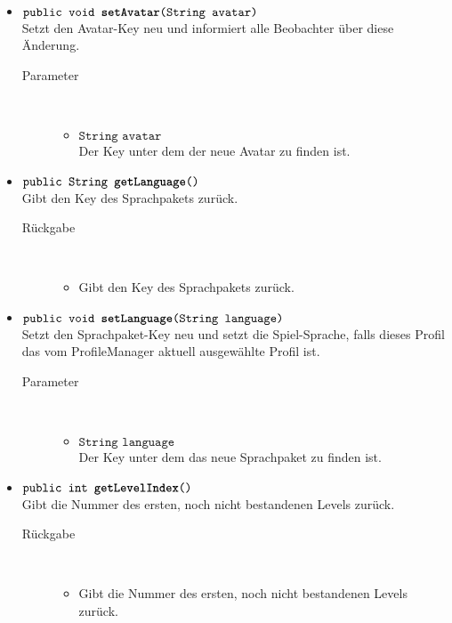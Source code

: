 \begin{description}
\begin{itemize}
		\item $\texttt{public void \textbf{setAvatar}(String avatar)}$ \\ Setzt den Avatar-Key neu und informiert alle Beobachter über diese Änderung.
		\begin{description}
			\item[Parameter] \hfill \\
			\vspace{-.8cm}
			\begin{itemize}
				\item $\texttt{String avatar}$ \\ Der Key unter dem der neue Avatar zu finden ist.
			\end{itemize}
		\end{description}
		
		\item $\texttt{public String \textbf{getLanguage}()}$ \\ Gibt den Key des Sprachpakets zurück.
		\begin{description}
			\item[Rückgabe] \hfill \\
			\vspace{-.8cm}
			\begin{itemize}
				\item Gibt den Key des Sprachpakets zurück.
			\end{itemize}
		\end{description}
		
		\item $\texttt{public void \textbf{setLanguage}(String language)}$ \\ Setzt den Sprachpaket-Key neu und setzt die Spiel-Sprache, falls dieses Profil das vom ProfileManager aktuell ausgewählte Profil ist.
		\begin{description}
			\item[Parameter] \hfill \\
			\vspace{-.8cm}
			\begin{itemize}
				\item $\texttt{String language}$ \\  Der Key unter dem das neue Sprachpaket zu finden ist.
			\end{itemize}
		\end{description}
		
		\item $\texttt{public int \textbf{getLevelIndex}()}$ \\ Gibt die Nummer des ersten, noch nicht bestandenen Levels zurück.
		\begin{description}
			\item[Rückgabe] \hfill \\
			\vspace{-.8cm}
			\begin{itemize}
				\item Gibt die Nummer des ersten, noch nicht bestandenen Levels zurück.
			\end{itemize}
		\end{description}
		

\end{itemize}
\end{description}
